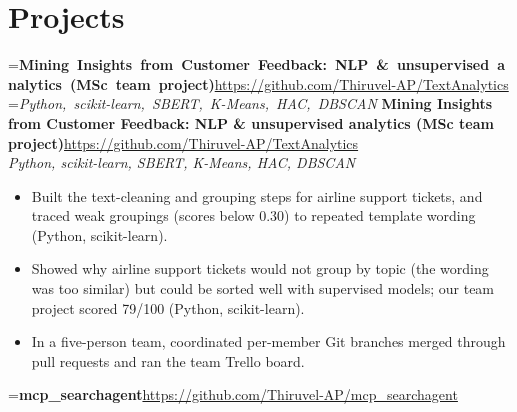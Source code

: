 \documentclass[a4paper,11pt]{article}
\newcommand{\project}[3]{%
  \textbf{#1}\hfill#3\\ {\color{muted}\small\textit{#2}}\par}
\newcommand{\gap}{\vspace{5pt}}
\begin{document}
\section{Projects}
=\hbox{\textbf{Mining Insights from Customer Feedback: NLP \& unsupervised analytics (MSc team project)}\hspace{1em}\url{https://github.com/Thiruvel-AP/TextAnalytics}}%
=\hbox{{\small\textit{Python, scikit-learn, SBERT, K-Means, HAC, DBSCAN}}}%
\ifdim\wd0>\linewidth
\ifdim\wd2>\linewidth
\textbf{Mining Insights from Customer Feedback: NLP \& unsupervised analytics (MSc team project)}\\ {\color{muted}\small\textit{Python, scikit-learn, SBERT, K-Means, HAC, DBSCAN}}\\ \hspace*{\fill}{\small\url{https://github.com/Thiruvel-AP/TextAnalytics}}\par
\else
\textbf{Mining Insights from Customer Feedback: NLP \& unsupervised analytics (MSc team project)}\\ {\color{muted}\small\textit{Python, scikit-learn, SBERT, K-Means, HAC, DBSCAN}}\hfill{\small\url{https://github.com/Thiruvel-AP/TextAnalytics}}\par
\fi
\else
\project{Mining Insights from Customer Feedback: NLP \& unsupervised analytics (MSc team project)}{Python, scikit-learn, SBERT, K-Means, HAC, DBSCAN}{\url{https://github.com/Thiruvel-AP/TextAnalytics}}
\fi
\begin{itemize}
  \item Built the text-cleaning and grouping steps for airline support tickets, and traced weak groupings (scores below 0.30) to repeated template wording (Python, scikit-learn).
  \item Showed why airline support tickets would not group by topic (the wording was too similar) but could be sorted well with supervised models; our team project scored 79/100 (Python, scikit-learn).
  \item In a five-person team, coordinated per-member Git branches merged through pull requests and ran the team Trello board.
\end{itemize}
\gap
{}
=\hbox{\textbf{mcp\_searchagent}\hspace{1em}\url{https://github.com/Thiruvel-AP/mcp_searchagent}}%
\end{document}
